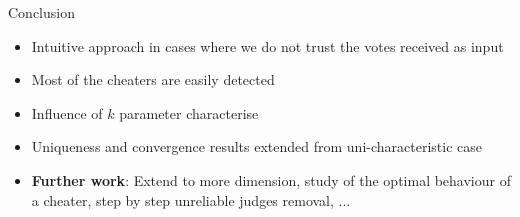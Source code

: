 \usebackgroundtemplate{}
\begin{frame}{Conclusion}
    \begin{itemize}
        \item Intuitive approach in cases where we do not trust the votes received as input
        \item Most of the cheaters are easily detected
        \item Influence of $k$ parameter characterise
        \item Uniqueness and convergence results extended from uni-characteristic case
        \item \textbf{Further work}: Extend to more dimension, study of the optimal behaviour of a cheater, step by step unreliable judges removal, ...
    \end{itemize}
\end{frame}